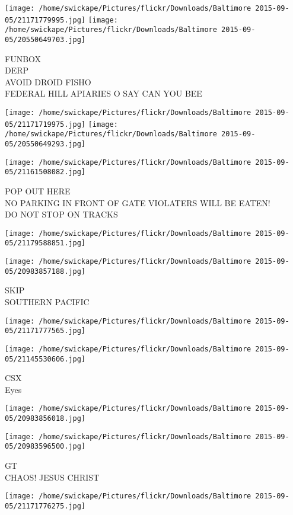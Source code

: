\documentclass[10pt,letterpaper]{article}
\begin{document}
\texttt{[image: /home/swickape/Pictures/flickr/Downloads/Baltimore 2015-09-05/21171779995.jpg]}
\texttt{[image: /home/swickape/Pictures/flickr/Downloads/Baltimore 2015-09-05/20550649703.jpg]}

FUNBOX\\
DERP\\
AVOID DROID FISHO\\
FEDERAL HILL APIARIES O SAY CAN YOU BEE
\pagebreak

\texttt{[image: /home/swickape/Pictures/flickr/Downloads/Baltimore 2015-09-05/21171719975.jpg]}
\texttt{[image: /home/swickape/Pictures/flickr/Downloads/Baltimore 2015-09-05/20550649293.jpg]}

\texttt{[image: /home/swickape/Pictures/flickr/Downloads/Baltimore 2015-09-05/21161508082.jpg]}

POP OUT HERE\\
NO PARKING IN FRONT OF GATE VIOLATERS WILL BE EATEN!\\
DO NOT STOP ON TRACKS
\pagebreak

\texttt{[image: /home/swickape/Pictures/flickr/Downloads/Baltimore 2015-09-05/21179588851.jpg]}

\vspace{0.25in}
\texttt{[image: /home/swickape/Pictures/flickr/Downloads/Baltimore 2015-09-05/20983857188.jpg]}

SKIP\\
SOUTHERN PACIFIC
\pagebreak

\texttt{[image: /home/swickape/Pictures/flickr/Downloads/Baltimore 2015-09-05/21171777565.jpg]}

\vspace{0.25in}
\texttt{[image: /home/swickape/Pictures/flickr/Downloads/Baltimore 2015-09-05/21145530606.jpg]}

CSX\\
Eyes
\pagebreak

\texttt{[image: /home/swickape/Pictures/flickr/Downloads/Baltimore 2015-09-05/20983856018.jpg]}

\vspace{0.25in}
\texttt{[image: /home/swickape/Pictures/flickr/Downloads/Baltimore 2015-09-05/20983596500.jpg]}

GT\\
CHAOS!  JESUS CHRIST
\pagebreak

\texttt{[image: /home/swickape/Pictures/flickr/Downloads/Baltimore 2015-09-05/21171776275.jpg]}
\end{document}
